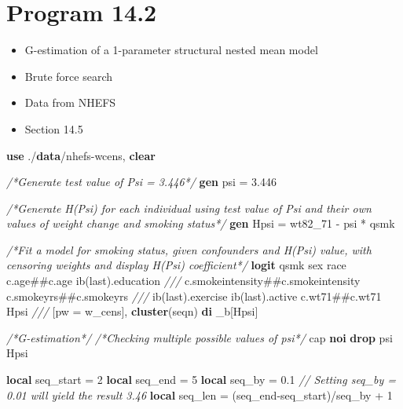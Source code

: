 \documentclass[
  10pt,
]{book}
\newenvironment{Shaded}{\begin{snugshade}}{\end{snugshade}}
\newcommand{\CommentTok}[1]{\textcolor[rgb]{0.56,0.35,0.01}{\textit{#1}}}
\newcommand{\FunctionTok}[1]{\textcolor[rgb]{0.00,0.00,0.00}{#1}}
\newcommand{\KeywordTok}[1]{\textcolor[rgb]{0.13,0.29,0.53}{\textbf{#1}}}
\newcommand{\NormalTok}[1]{#1}
\newcommand{\OtherTok}[1]{\textcolor[rgb]{0.56,0.35,0.01}{#1}}
\providecommand{\tightlist}{%
  \setlength{\itemsep}{0pt}\setlength{\parskip}{0pt}}
\begin{document}
\hypertarget{program-14.2-1}{%
\section{Program 14.2}\label{program-14.2-1}}

\begin{itemize}
\tightlist
\item
  G-estimation of a 1-parameter structural nested mean model
\item
  Brute force search
\item
  Data from NHEFS
\item
  Section 14.5
\end{itemize}

\begin{Shaded}
\begin{Highlighting}[]
\KeywordTok{use}\NormalTok{ ./}\KeywordTok{data}\NormalTok{/nhefs{-}wcens, }\KeywordTok{clear}

\CommentTok{/*Generate test value of Psi = 3.446*/}
\KeywordTok{gen}\NormalTok{ psi = 3.446}

\CommentTok{/*Generate H(Psi) for each individual using test value of Psi and their own values of weight change and smoking status*/}
\KeywordTok{gen}\NormalTok{ Hpsi = wt82\_71 {-} psi * qsmk }

\CommentTok{/*Fit a model for smoking status, given confounders and H(Psi) value, with censoring weights and display H(Psi) coefficient*/}
\KeywordTok{logit}\NormalTok{ qsmk sex race c.age\#\#c.age ib(}\FunctionTok{last}\NormalTok{).education }\CommentTok{///}
\NormalTok{  c.smokeintensity\#\#c.smokeintensity c.smokeyrs\#\#c.smokeyrs }\CommentTok{///}
\NormalTok{  ib(}\FunctionTok{last}\NormalTok{).exercise ib(}\FunctionTok{last}\NormalTok{).active c.wt71\#\#c.wt71 Hpsi }\CommentTok{///}
\NormalTok{  [pw = w\_cens], }\KeywordTok{cluster}\NormalTok{(seqn)}
\KeywordTok{di}\NormalTok{ \_b[Hpsi]}

\CommentTok{/*G{-}estimation*/}
\CommentTok{/*Checking multiple possible values of psi*/}
\NormalTok{cap }\KeywordTok{noi} \KeywordTok{drop}\NormalTok{ psi Hpsi}

\KeywordTok{local}\NormalTok{ seq\_start = 2}
\KeywordTok{local}\NormalTok{ seq\_end = 5}
\KeywordTok{local}\NormalTok{ seq\_by = 0.1 }\CommentTok{// Setting seq\_by = 0.01 will yield the result 3.46}
\KeywordTok{local}\NormalTok{ seq\_len = (}\OtherTok{\textasciigrave{}seq\_end\textquotesingle{}}\NormalTok{{-}}\OtherTok{\textasciigrave{}seq\_start\textquotesingle{}}\NormalTok{)/}\OtherTok{\textasciigrave{}seq\_by\textquotesingle{}}\NormalTok{ + 1}
                 

\end{Highlighting}
\end{Shaded}
\end{document}
